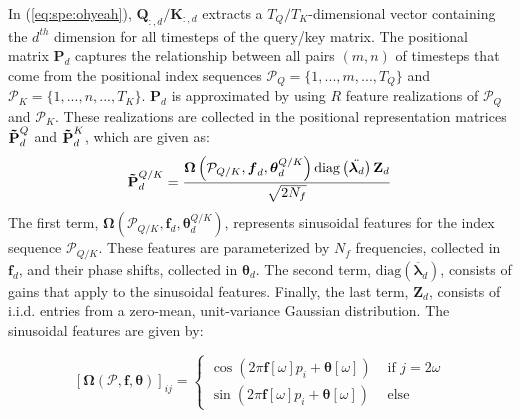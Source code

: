 In (\ref{eq:spe:ohyeah}), $\mathbf{Q}_{:, d}/\mathbf{K}_{:, d}$ extracts a $T_Q/T_K$-dimensional vector containing the $d^{th}$ dimension for all timesteps of the query/key matrix. The positional matrix $\mathbf{P}_d$ captures the relationship between all pairs $(m, n)$ of timesteps that come from the positional index sequences $\mathcal{P}_Q = \{ 1, ..., m, ..., T_Q \}$ and $\mathcal{P}_K = \{ 1, ..., n, ..., T_K \}$. $\mathbf{P}_d$ is approximated by using $R$ feature realizations of $\mathcal{P}_Q$ and $\mathcal{P}_K$. These realizations are collected in the positional representation matrices $\mathbf{\tilde{\text{$\mathbf{P}$}}}^Q_d$ and $\mathbf{\tilde{\text{$\mathbf{P}$}}}^K_d$, which are given as:
\begin{equation} \label{eq:sff}
    \mathbf{\tilde{\text{$\mathbf{P}$}}}^{Q/K}_d = \frac{\boldsymbol{\Omega}\left(\mathcal{P}_{Q/K}, \boldsymbol{f}_d, \boldsymbol{\theta}_d^{Q/K}\right) \text{diag}\left(\ddot{\boldsymbol{\lambda}_d}\right) \mathbf{Z}_d}{\sqrt{2 N_f}}
\end{equation}
The first term, $\boldsymbol{\Omega}\left(\mathcal{P}_{Q/K}, \boldsymbol{f}_d, \boldsymbol{\theta}_d^{Q/K}\right)$, represents sinusoidal features for the index sequence $\mathcal{P}_{Q/K}$. These features are parameterized by $N_f$ frequencies, collected in $\boldsymbol{f}_d$, and their phase shifts, collected in $\boldsymbol{\theta}_d$. The second term, $\text{diag}\left(\ddot{\boldsymbol{\lambda}_d}\right)$, consists of gains that apply to the sinusoidal features. Finally, the last term, $\mathbf{Z}_d$, consists of i.i.d. entries from a zero-mean, unit-variance Gaussian distribution. The sinusoidal features are given by:


\begin{equation} \label{eq:sff:sine_features}
[\boldsymbol{\Omega}(\mathcal{P}, \boldsymbol{f}, \boldsymbol{\theta})]_{i j}= \begin{cases}\cos \left(2 \pi \mathbf{f}[\omega] p_i+\boldsymbol{\theta}[\omega]\right) & \text { if } j = 2\omega \\ \sin \left(2 \pi \mathbf{f}[\omega] p_i+\boldsymbol{\theta}[\omega] \right) & \text { else }\end{cases}
\end{equation}

